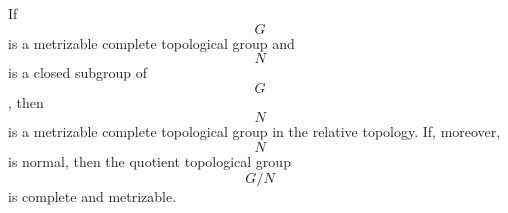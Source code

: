 If $$G$$ is a metrizable complete topological group and $$N$$ is a closed subgroup of $$G$$, then $$N$$ is a metrizable complete topological group in the relative topology. If, moreover, $$N$$ is normal, then the quotient topological group $$G/N$$ is complete and metrizable.
